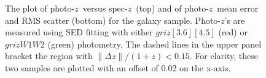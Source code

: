 \documentclass[useAMS,usenatbib,iop,numberedappendix]{mn2e}
\newcommand{\redshift}{\ensuremath{z}}
\newcommand{\IRACone}{\ensuremath{[3.6]}}
\newcommand{\IRACtwo}{\ensuremath{[4.5]}}
\newcommand{\Wone}{\ensuremath{W1}}
\newcommand{\Wtwo}{\ensuremath{W2}}
\begin{document}
%
\begin{figure}
\vskip-0.15in
\centering
{}
\vskip-0.20in
\caption{
The plot of photo-\redshift\ versus spec-\redshift\ (top) and of photo-\redshift\ mean error and RMS scatter (bottom) for the galaxy sample.
Photo-\redshift's are measured using SED fitting with either $griz\IRACone\IRACtwo$ (red) or $griz\Wone\Wtwo$ (green) photometry.  The dashed lines in the upper panel bracket the region with $\| \Delta\redshift \| / (1 + \redshift) < 0.15$.  For clarity, these two samples are plotted with an offset of 0.02 on the x-axis.
}
\label{fig:zpzs}
\end{figure}
%
\end{document}
